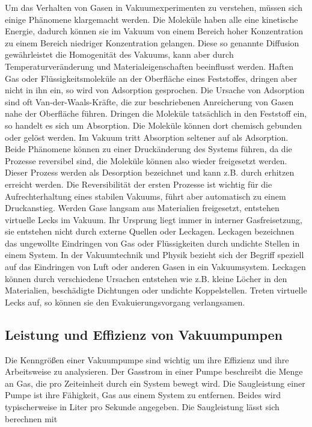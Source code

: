 Um das Verhalten von Gasen in Vakuumexperimenten zu verstehen, müssen sich einige Phänomene klargemacht werden.
Die Moleküle haben alle
eine kinetische Energie, dadurch können sie im Vakuum von einem Bereich hoher Konzentration zu einem Bereich niedriger Konzentration 
gelangen. Diese so genannte Diffusion gewährleistet die Homogenität des Vakuums, kann aber durch Temperaturveränderung und Materialeigenschaften
beeinflusst werden. Haften Gas oder Flüssigkeitsmoleküle an der Oberfläche eines Feststoffes, dringen aber nicht in ihn ein, so wird 
von Adsorption gesprochen. Die Ursache von Adsorption sind oft Van-der-Waals-Kräfte, die zur beschriebenen Anreicherung von Gasen nahe der Oberfläche führen.
Dringen die Moleküle tatsächlich in den Feststoff ein, so handelt es sich um Absorption. Die Moleküle können dort chemisch gebunden oder 
gelöst werden. Im Vakuum tritt Absorption seltener auf als Adsorption. Beide Phänomene können zu einer Druckänderung des Systems führen,
da die Prozesse reversibel sind, die Moleküle können also wieder freigesetzt werden. Dieser Prozess werden als Desorption bezeichnet und kann z.B. durch erhitzen
 erreicht werden. Die Reversibilität der ersten Prozesse ist wichtig für die Aufrechterhaltung eines stabilen Vakuums, führt aber automatisch zu einem Druckanstieg. 
Werden Gase langsam aus Materialien freigesetzt, entstehen virtuelle Lecks im Vakuum. Ihr Ursprung liegt immer in interner Gasfreisetzung, 
sie entstehen nicht durch externe Quellen oder Leckagen.
Leckagen bezeichnen das ungewollte Eindringen von Gas oder Flüssigkeiten durch undichte Stellen in einem System. In der Vakuumtechnik und Physik bezieht sich der Begriff
speziell auf das Eindringen von Luft oder anderen Gasen in ein Vakuumsystem. Leckagen können durch verschiedene Ursachen entstehen wie z.B.
kleine Löcher in den Materialien, beschädigte Dichtungen oder undichte Koppelstellen.
Treten virtuelle Lecks auf, so können sie den Evakuierungsvorgang verlangsamen.

\subsection{Leistung und Effizienz von Vakuumpumpen}


Die Kenngrößen einer Vakuumpumpe sind wichtig um ihre Effizienz und ihre Arbeitsweise zu analysieren.
Der Gasstrom in einer Pumpe beschreibt die Menge an Gas, die pro Zeiteinheit durch ein System bewegt wird. Die Saugleistung einer Pumpe ist ihre 
Fähigkeit, Gas aus einem System zu entfernen. Beides wird typischerweise in Liter pro Sekunde angegeben. Die Saugleistung lässt sich berechnen mit

